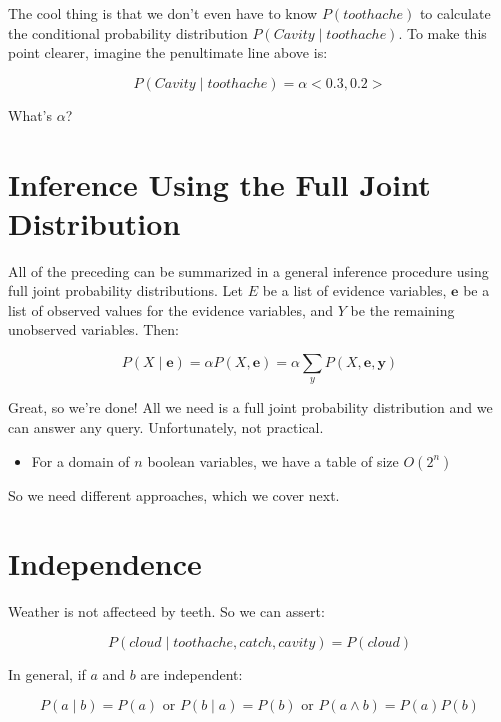 \documentclass[11pt]{article}
\begin{document}
The cool thing is that we don't even have to know \(P(toothache)\) to calculate the conditional probability distribution \(P(Cavity \mid toothache)\).  To make this point clearer, imagine the penultimate line above is:

\begin{equation*}
P(Cavity  \mid  toothache) = \alpha <0.3, 0.2>
\end{equation*}

What's \(\alpha\)?
\section{Inference Using the Full Joint Distribution}
\label{sec:org055db2d}

All of the preceding can be summarized in a general inference procedure using full joint probability distributions.  Let \(E\) be a list of evidence variables, \(\bm{e}\) be a list of observed values for the evidence variables, and \(Y\) be the remaining unobserved variables.  Then:

\begin{equation*}
P(X  \mid  \bm{e}) = \alpha P(X, \bm{e}) = \alpha \sum_y P(X, \bm{e}, \bm{y}) \tag{12.9}
\end{equation*}

Great, so we're done!  All we need is a full joint probability distribution and we can answer any query.  Unfortunately, not practical.

\begin{itemize}
\item For a domain of \(n\) boolean variables, we have a table of size \(O(2^n)\)
\end{itemize}

So we need different approaches, which we cover next.
\section{Independence}
\label{sec:orgbc5b3a2}

Weather is not affecteed by teeth.  So we can assert:

\begin{equation*}
P(cloud  \mid toothache,catch,cavity) = P(cloud)
\end{equation*}

In general, if \(a\) and \(b\) are independent:

\begin{equation*}
P(a \mid b) = P(a) \text{ or } P(b \mid a) = P(b) \text{ or } P(a \land b) = P(a)P(b)
\end{equation*}
\end{document}
